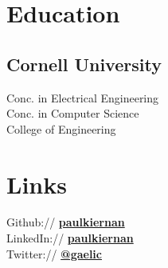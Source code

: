 \documentclass[]{deedy-resume-openfont}
\begin{document}
\lastupdated



\begin{minipage}[t]{0.33\textwidth}


\section{Education} 

\subsection{Cornell University}
    Conc. in Electrical Engineering \\
    Conc. in Computer Science\\
    College of Engineering \\
\sectionsep


\section{Links}
    Github:// \href{https://github.com/paulkiernan}{\bf paulkiernan} \\
    LinkedIn://  \href{https://www.linkedin.com/pub/paul-kiernan/24/a32/470}{\bf paulkiernan} \\
    Twitter://  \href{https://twitter.com/gaelic}{\bf @gaelic} \\
\sectionsep



\end{minipage}
\end{document}
